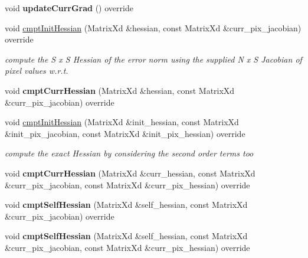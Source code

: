 \begin{DoxyCompactItemize}
\item 
\hypertarget{classCCRE_ab28162c5805e25a9fe16c471e796ec39}{void {\bfseries update\-Curr\-Grad} () override}\label{classCCRE_ab28162c5805e25a9fe16c471e796ec39}

\item 
void \hyperlink{classCCRE_a2357913ffb5630de31b891c9847d1c0a}{cmpt\-Init\-Hessian} (Matrix\-Xd \&hessian, const Matrix\-Xd \&curr\-\_\-pix\-\_\-jacobian) override
\begin{DoxyCompactList}\small\item\em compute the S x S Hessian of the error norm using the supplied N x S Jacobian of pixel values w.\-r.\-t. \end{DoxyCompactList}\item 
\hypertarget{classCCRE_a09dfa7ac01a955a71c1f4a4fe2086411}{void {\bfseries cmpt\-Curr\-Hessian} (Matrix\-Xd \&hessian, const Matrix\-Xd \&curr\-\_\-pix\-\_\-jacobian) override}\label{classCCRE_a09dfa7ac01a955a71c1f4a4fe2086411}

\item 
\hypertarget{classCCRE_a9d4f059246c4eac4cacccd47f38a517f}{void \hyperlink{classCCRE_a9d4f059246c4eac4cacccd47f38a517f}{cmpt\-Init\-Hessian} (Matrix\-Xd \&init\-\_\-hessian, const Matrix\-Xd \&init\-\_\-pix\-\_\-jacobian, const Matrix\-Xd \&init\-\_\-pix\-\_\-hessian) override}\label{classCCRE_a9d4f059246c4eac4cacccd47f38a517f}

\begin{DoxyCompactList}\small\item\em compute the exact Hessian by considering the second order terms too \end{DoxyCompactList}\item 
\hypertarget{classCCRE_ad8f83bc4d5afc1425a1d9e6a7c6584d1}{void {\bfseries cmpt\-Curr\-Hessian} (Matrix\-Xd \&curr\-\_\-hessian, const Matrix\-Xd \&curr\-\_\-pix\-\_\-jacobian, const Matrix\-Xd \&curr\-\_\-pix\-\_\-hessian) override}\label{classCCRE_ad8f83bc4d5afc1425a1d9e6a7c6584d1}

\item 
\hypertarget{classCCRE_a1f10eb0fc8a53cb6f257cadc9e4af172}{void {\bfseries cmpt\-Self\-Hessian} (Matrix\-Xd \&self\-\_\-hessian, const Matrix\-Xd \&curr\-\_\-pix\-\_\-jacobian) override}\label{classCCRE_a1f10eb0fc8a53cb6f257cadc9e4af172}

\item 
\hypertarget{classCCRE_a657d200ec0aa7c0a41217ee02ed19fd7}{void {\bfseries cmpt\-Self\-Hessian} (Matrix\-Xd \&self\-\_\-hessian, const Matrix\-Xd \&curr\-\_\-pix\-\_\-jacobian, const Matrix\-Xd \&curr\-\_\-pix\-\_\-hessian) override}\label{classCCRE_a657d200ec0aa7c0a41217ee02ed19fd7}


\end{DoxyCompactItemize}
